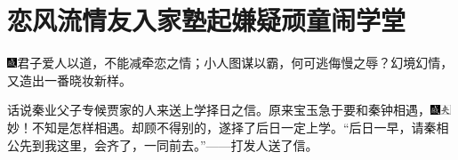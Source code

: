 

\chapter{恋风流情友入家塾\hspace{.5em}起嫌疑顽童闹学堂}

{\includegraphics[width=3mm]{../Images/00005}\kaishu 君子爱人以道，不能减牵恋之情；小人图谋以霸，何可逃侮慢之辱？幻境幻情，又造出一番晓妆新样。}

话说秦业父子专候贾家的人来送上学择日之信。原来宝玉急于要和秦钟相遇，{\includegraphics[width=3mm]{../Images/00005}\includegraphics[width=3mm]{../Images/00012}\footnotesize \kaishu 妙！不知是怎样相遇。}却顾不得别的，遂择了后日一定上学。``后日一早，请秦相公先到我这里，会齐了，一同前去。''------打发人送了信。


